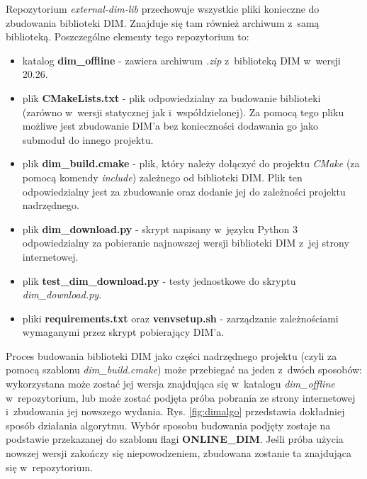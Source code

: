 Repozytorium \textit{external-dim-lib} przechowuje wszystkie pliki konieczne do zbudowania biblioteki DIM. Znajduje się tam również archiwum z~samą biblioteką. Poszczególne elementy tego repozytorium to:
\begin{itemize}
\item katalog \textbf{dim\_offline} - zawiera archiwum \textit{.zip} z~biblioteką DIM w~wersji 20.26.
\item plik \textbf{CMakeLists.txt} - plik odpowiedzialny za budowanie biblioteki (zarówno w~wersji statycznej jak i~współdzielonej). Za pomocą tego pliku możliwe jest zbudowanie DIM'a bez konieczności dodawania go jako submoduł do innego projektu.
\item plik \textbf{dim\_build.cmake} - plik, który należy dołączyć do projektu \textit{CMake} (za pomocą komendy \textit{include}) zależnego od biblioteki DIM. Plik ten odpowiedzialny jest za zbudowanie oraz dodanie jej do zależności projektu nadrzędnego.
\item plik \textbf{dim\_download.py} - skrypt napisany w~języku Python 3 odpowiedzialny za pobieranie najnowszej wersji biblioteki DIM z~jej strony internetowej.
\item plik \textbf{test\_dim\_download.py} - testy jednostkowe do skryptu \textit{dim\_download.py}.
\item pliki \textbf{requirements.txt} oraz \textbf{venvsetup.sh} - zarządzanie zależnościami wymaganymi przez skrypt pobierający DIM'a.
\end{itemize}

Proces budowania biblioteki DIM jako części nadrzędnego projektu (czyli za pomocą szablonu \textit{dim\_build.cmake}) może przebiegać na jeden z~dwóch sposobów: wykorzystana może zostać jej wersja znajdująca się w~katalogu \textit{dim\_offline} w~repozytorium, lub może zostać podjęta próba pobrania ze strony internetowej i~zbudowania jej nowszego wydania. Rys. \ref{fig:dimalgo} przedstawia dokładniej sposób działania algorytmu. Wybór sposobu budowania podjęty zostaje na podstawie przekazanej do szablonu flagi \textbf{ONLINE\_DIM}. Jeśli próba użycia nowszej wersji zakończy się niepowodzeniem, zbudowana zostanie ta znajdująca się w~repozytorium.


